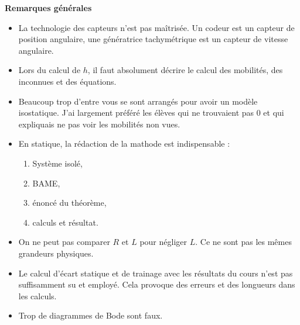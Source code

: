 \documentclass[10pt,fleqn]{book} %
\begin{document}
\textbf{Remarques générales}
\begin{itemize}
\item La technologie des capteurs n'est pas maîtrisée. Un codeur est un capteur de position angulaire, une génératrice tachymétrique est un capteur de vitesse angulaire. 
\item Lors du calcul de $h$, il faut absolument décrire le calcul des mobilités, des inconnues et des équations. 
\item Beaucoup trop d'entre vous se sont arrangés pour avoir un modèle isostatique. J'ai largement préféré les élèves qui ne trouvaient pas 0 et qui expliquais ne pas voir les mobilités non vues. 
\item En statique, la rédaction de la mathode est indispensable : 
\begin{enumerate}
\item Système isolé,
\item BAME, 
\item énoncé du théorème, 
\item calculs et résultat.
\end{enumerate}
\item On ne peut pas comparer $R$ et $L$ pour négliger $L$. Ce ne sont pas les mêmes grandeurs physiques. 
\item Le calcul d'écart statique et de trainage avec les résultats du cours n'est pas suffisamment su et employé. 
Cela provoque des erreurs et des longueurs dans les calculs. 
\item Trop de diagrammes de Bode sont faux. 
\end{itemize}
%


\end{document}
